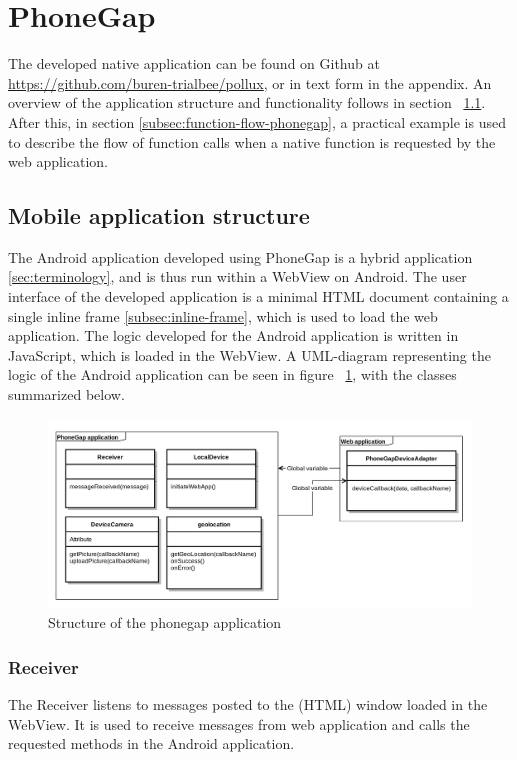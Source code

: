 \section{PhoneGap}\label{sec:phonegap}
The developed native application can be found on Github at \url{https://github.com/buren-trialbee/pollux}, or in text form in the appendix. An overview of the application structure and functionality follows in section ~\ref{subsec:application-structure-phonegap}. After this, in section \ref{subsec:function-flow-phonegap}, a practical example is used to describe the flow of function calls when a native function is requested by the web application.
\subsection{Mobile application structure} \label{subsec:application-structure-phonegap}
The Android application developed using PhoneGap is a hybrid application \ref{sec:terminology}, and is thus run within a WebView on Android. The user interface of the developed application is a minimal HTML document containing a single inline frame \ref{subsec:inline-frame}, which is used to load the web application. The logic developed for the Android application is written in JavaScript, which is loaded in the WebView. A UML-diagram representing the logic of the Android application can be seen in figure ~\ref{fig:phonegapuml},  with the classes summarized below.
\begin{figure}[h!]
	\centering
    \includegraphics[width=150mm,natwidth=1000,natheight=750]{./img/phonegapuml.png}
    \caption{Structure of the phonegap application}
    \label{fig:phonegapuml}
\end{figure}

\subsubsection{Receiver}
The Receiver listens to messages posted to the (HTML) window loaded in the WebView. It is used to receive messages from web application and calls the requested methods in the Android application.
